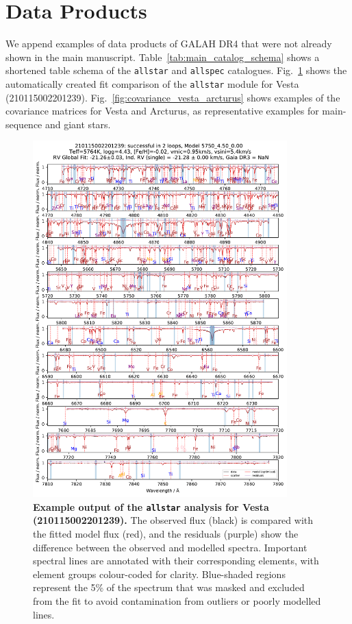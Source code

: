 \documentclass[
  journal=pasa,
  manuscript=research-paper, %
  year=2024,
  volume=37
]{cup-journal}
\begin{document}
\section{Data Products}

We append examples of data products of GALAH DR4 that were not already shown in the main manuscript. Table~\ref{tab:main_catalog_schema} shows a shortened table schema of the \texttt{allstar} and \texttt{allspec} catalogues. Fig.~\ref{fig:210115002201239_allstar_fit_comparison} shows the automatically created fit comparison of the \texttt{allstar} module for Vesta (210115002201239). Fig.~\ref{fig:covariance_vesta_arcturus} shows examples of the covariance matrices for Vesta and Arcturus, as representative examples for main-sequence and giant stars.



\begin{figure}[ht]
 \centering
 \includegraphics[width=0.875\textwidth]{figures/210115002201239_allstar_fit_comparison.pdf} \caption{\textbf{ Example output of the \texttt{allstar} analysis for Vesta (210115002201239).} The observed flux (black) is compared with the fitted model flux (red), and the residuals (purple) show the difference between the observed and modelled spectra. Important spectral lines are annotated with their corresponding elements, with element groups colour-coded for clarity. Blue-shaded regions represent the 5\% of the spectrum that was masked and excluded from the fit to avoid contamination from outliers or poorly modelled lines.}
\label{fig:210115002201239_allstar_fit_comparison}
\end{figure}
\end{document}
